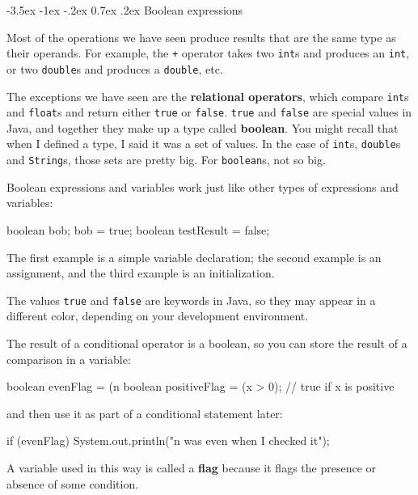 \documentclass{book}
\makeatletter
\renewcommand{\section}{\@startsection 
    {section} {1} {0mm}%
    {-3.5ex \@plus -1ex \@minus -.2ex}%
    {0.7ex \@plus.2ex}%
    {\normalfont\Large\bfseries}}
\makeatother
\begin{document}
\section{Boolean expressions}

Most of the operations we have seen produce results that are
the same type as their operands.  For example, the {\tt +} operator
takes two {\tt int}s and produces an {\tt int}, or two {\tt double}s
and produces a {\tt double}, etc.


The exceptions we have seen are the {\bf relational operators}, which
compare {\tt int}s and {\tt float}s and return either {\tt true} or
{\tt false}.  {\tt true} and {\tt false} are special values in Java,
and together they make up a type called {\bf boolean}.  You might
recall that when I defined a type, I said it was a set of values.  In
the case of {\tt int}s, {\tt double}s and {\tt String}s, those sets
are pretty big.  For {\tt boolean}s, not so big.

Boolean expressions and variables work just like other types of
expressions and variables:

\begin{verbatimtab}
    boolean bob;
    bob = true;
    boolean testResult = false;
\end{verbatimtab}
%
The first example is a simple variable declaration;
the second example is an assignment, and the third example is an
initialization.

The values {\tt true} and {\tt false}
are keywords in Java, so they may appear in a different color,
depending on your development environment.


The result of a conditional operator is a boolean,
so you can store the result of a comparison in a variable:

\begin{verbatimtab}
    boolean evenFlag = (n%
    boolean positiveFlag = (x > 0);    // true if x is positive
\end{verbatimtab}
%
and then use it as part of a conditional statement later:

\begin{verbatimtab}
    if (evenFlag) {
      System.out.println("n was even when I checked it");
    }
\end{verbatimtab}
%
A variable used in this way is called a {\bf flag}
because it flags the presence or absence of some condition.
\end{document}
